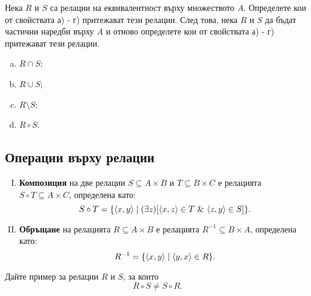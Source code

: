 \begin{problem}
  Нека $R$ и $S$ са релации на еквивалентност върху множеството $A$.
  Определете кои от свойствата а) - г) притежават тези релации.
  След това, нека $R$ и $S$ да бъдат частични наредби върху $A$
  и отново определете кои от свойствата а) - г) притежават тези релации.
  \begin{enumerate}[a)]
  \item
    $R \cap S$;
  \item
    $R \cup S$;
  \item
    $R \setminus S$;
  \item
    $R \circ S$.
  \end{enumerate}
\end{problem}


\subsection*{Операции върху релации}
\begin{enumerate}[I)]
\item
  {\bf Композиция} на две релации $S \subseteq A\times B$ и $T \subseteq B\times C$ е релацията $S\circ T \subseteq A\times C$,
  определена като:
  \[S\circ T = \{\langle{x,y}\rangle \mid (\exists z)[\pair{x,z}\in T\ \&\ \pair{z,y} \in S]\}.\]
\item
  {\bf Обръщане} на релацията $R \subseteq A\times B$ е релацията $R^{-1}\subseteq B\times A$, 
  определена като:
  \[R^{-1} = \{\langle{x,y}\rangle \mid \langle{y,x}\rangle \in R\}.\]
  
\end{enumerate}

\begin{problem}
  Дайте пример за релации $R$ и $S$, за които
  \[R\circ S \neq S\circ R.\]
\end{problem}

